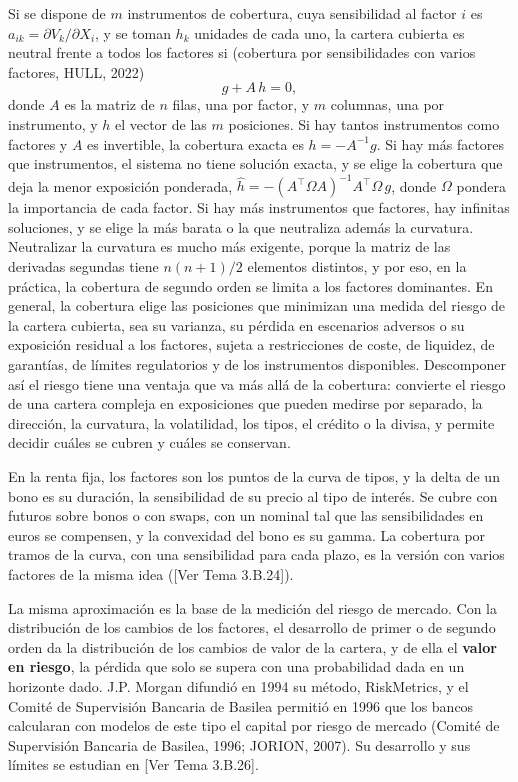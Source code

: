 \documentclass[10pt,a4paper]{article}
\newcommand{\authorfont}[1]{{\fontfamily{EBGaramond-TLF}\selectfont #1}}
\begin{document}
Si se dispone de $m$ instrumentos de cobertura, cuya sensibilidad al factor $i$ es $a_{ik}=\partial V_k/\partial X_i$, y se toman $h_k$ unidades de cada uno, la cartera cubierta es neutral frente a todos los factores si (cobertura por sensibilidades con varios factores, HULL, 2022)
$$g+A\,h=0,$$
donde $A$ es la matriz de $n$ filas, una por factor, y $m$ columnas, una por instrumento, y $h$ el vector de las $m$ posiciones. Si hay tantos instrumentos como factores y $A$ es invertible, la cobertura exacta es $h=-A^{-1}g$. Si hay más factores que instrumentos, el sistema no tiene solución exacta, y se elige la cobertura que deja la menor exposición ponderada, $\hat h=-\left(A^{\top}\Omega A\right)^{-1}A^{\top}\Omega\,g$, donde $\Omega$ pondera la importancia de cada factor. Si hay más instrumentos que factores, hay infinitas soluciones, y se elige la más barata o la que neutraliza además la curvatura. Neutralizar la curvatura es mucho más exigente, porque la matriz de las derivadas segundas tiene $n(n+1)/2$ elementos distintos, y por eso, en la práctica, la cobertura de segundo orden se limita a los factores dominantes. En general, la cobertura elige las posiciones que minimizan una medida del riesgo de la cartera cubierta, sea su varianza, su pérdida en escenarios adversos o su exposición residual a los factores, sujeta a restricciones de coste, de liquidez, de garantías, de límites regulatorios y de los instrumentos disponibles. Descomponer así el riesgo tiene una ventaja que va más allá de la cobertura: convierte el riesgo de una cartera compleja en exposiciones que pueden medirse por separado, la dirección, la curvatura, la volatilidad, los tipos, el crédito o la divisa, y permite decidir cuáles se cubren y cuáles se conservan.

En la renta fija, los factores son los puntos de la curva de tipos, y la delta de un bono es su duración, la sensibilidad de su precio al tipo de interés. Se cubre con futuros sobre bonos o con swaps, con un nominal tal que las sensibilidades en euros se compensen, y la convexidad del bono es su gamma. La cobertura por tramos de la curva, con una sensibilidad para cada plazo, es la versión con varios factores de la misma idea ([\authorfont{Ver Tema 3.B.24}]).

La misma aproximación es la base de la medición del riesgo de mercado. Con la distribución de los cambios de los factores, el desarrollo de primer o de segundo orden da la distribución de los cambios de valor de la cartera, y de ella el \textbf{valor en riesgo}, la pérdida que solo se supera con una probabilidad dada en un horizonte dado. J.P. Morgan difundió en 1994 su método, RiskMetrics, y el Comité de Supervisión Bancaria de Basilea permitió en 1996 que los bancos calcularan con modelos de este tipo el capital por riesgo de mercado (Comité de Supervisión Bancaria de Basilea, 1996; JORION, 2007). Su desarrollo y sus límites se estudian en [\authorfont{Ver Tema 3.B.26}].
\end{document}
